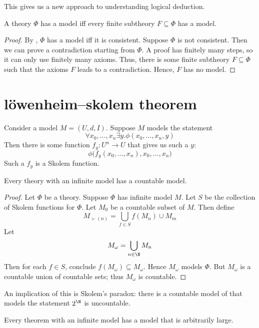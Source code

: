 \message{ !name(truth.tex)}\documentclass{scrbook}
\begin{document}
This gives us a new approach to understanding logical deduction. 
\begin{theorem} \label{th:compactness}
  A theory $\Phi$ has a model iff every finite subtheory $F\subseteq \Phi$ has a model.
\end{theorem}
\begin{proof}
  By , $\Phi$ has a model iff it is consistent. Suppose $\Phi$ is not consistent. Then we can prove a contradiction starting from $\Phi$. A proof has finitely many steps, so it can only use finitely many axioms. Thus, there is some finite subtheory $F\subseteq \Phi$ such that the axioms $F$ leads to a contradiction. Hence, $F$ has no model. 
\end{proof}
\section[Löwenheim–Skolem theorem]{löwenheim–skolem theorem}
\begin{defn}
  Consider a model $M=(U,d,I)$. Suppose $M$ models the statement
  \[
  \forall x_0,\dots, x_n \exists y . \phi(x_0,\dots,x_n,y)
  \]
  Then there is some function $f_y:U^n\to U$ that gives us such a $y$:
  \[
  \phi\bigl(f_y(x_0,\dots, x_n),x_0,\dots, x_n\bigr)
  \]
  Such a $f_y$ is a Skolem function. 
\end{defn}
\begin{theorem}\label{th:ls-down}
  Every theory with an infinite model has a countable model. 
\end{theorem}
\begin{proof}
  Let $\Phi$ be a theory. Suppose $\Phi$ has infinite model $M$. Let $S$ be the collection of Skolem functions for $\Phi$. Let $M_0$ be a countable subset of $M$. Then define
  \[
  M_{\succ(n)} = \bigcup_{f\in S} f(M_n) \cup M_m
  \]
  Let
  \[
  M_\omega = \bigcup_{n\in \N} M_n
  \]
  Then for each $f\in S$, conclude $f(M_\omega)\subseteq M_\omega$. Hence $M_\omega$ models $\Phi$. But $M_\omega$ is a countable union of countable sets; thus $M_\omega$ is countable. 
\end{proof}
An implication of this is Skolem's paradox: there is a countable model of \zfc that models the statement $2^\N$ is uncountable. 
\begin{theorem}
  Every theorem with an infinite model has a model that is arbitrarily large.
\end{theorem}
\end{document}
